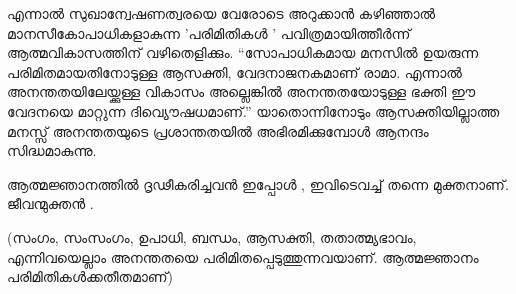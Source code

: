 എന്നാല്‍ സുഖാന്വേഷണത്വരയെ വേരോടെ അറുക്കാന്‍ കഴിഞ്ഞാല്‍ മാനസീകോപാധികളാകുന്ന  'പരിമിതികള്‍ ' പവിത്രമായിത്തീര്‍ന്ന് ആത്മവികാസത്തിന് വഴിതെളിക്കും. “സോപാധികമായ മനസില്‍ ഉയരുന്ന പരിമിതമായതിനോടുള്ള ആസക്തി, വേദനാജനകമാണ് രാമാ. എന്നാല്‍ അനന്തതയിലേയ്ക്കുള്ള വികാസം അല്ലെങ്കില്‍ അനന്തതയോടുള്ള ഭക്തി ഈ വേദനയെ മാറ്റുന്ന ദിവ്യൌഷധമാണ്.” യാതൊന്നിനോടും ആസക്തിയില്ലാത്ത മനസ്സ് അനന്തതയുടെ പ്രശാന്തതയില്‍ അഭിരമിക്കുമ്പോള്‍ ആനന്ദം സിദ്ധമാകുന്നു.

ആത്മജ്ഞാനത്തില്‍ ദൃഢീകരിച്ചവന്‍ ഇപ്പോള്‍ , ഇവിടെവച്ച് തന്നെ മുക്തനാണ്. ജീവന്മുക്തന്‍ . 

(സംഗം, സംസംഗം, ഉപാധി, ബന്ധം, ആസക്തി, തതാത്മ്യഭാവം, എന്നിവയെല്ലാം അനന്തതയെ പരിമിതപ്പെടുത്തുന്നവയാണ്. ആത്മജ്ഞാനം പരിമിതികള്‍ക്കതീതമാണ്) 

